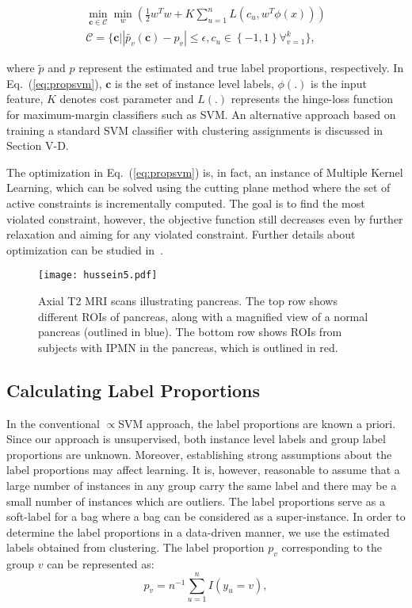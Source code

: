 \documentclass[journal]{IEEEtran}
\DeclareMathOperator*{\minimum}{min}
\begin{document}
\begin{equation}
\begin{split}
\minimum_{\mathbf{c} \in \mathcal{C}} \minimum_{w} \left(\frac{1}{2}w^Tw+K\sum_{u=1}^{n}L(c_u,w^T\phi(x))\right)\\
\mathcal{C}=\biggl\{ \mathbf{c} \bigg| \left | \widetilde{p_v}(\mathbf{c})-p_v \right | \leq \epsilon ,c_u \in \left \{ -1,1 \right \} \forall_{v=1}^{k} \biggr\},
\end{split}
\label{eq:propsvm}
\end{equation}

\noindent where $\widetilde{p}$ and $p$ represent the estimated and true label proportions, respectively. In Eq.~(\ref{eq:propsvm}), $\mathbf{c}$ is the set of instance level labels, $\phi(.)$ is the input feature, $K$ denotes cost parameter and $L(.)$ represents the hinge-loss function for maximum-margin classifiers such as SVM. An alternative approach based on training a standard SVM classifier with clustering assignments is discussed in Section V-D.

The optimization in Eq.~(\ref{eq:propsvm}) is, in fact, an instance of Multiple Kernel Learning, which can be solved using the cutting plane method where the set of active constraints is incrementally computed. The goal is to find the most violated constraint, however, the objective function still decreases even by further relaxation and aiming for any violated constraint. Further details about optimization can be studied in~\cite{yu2013propto}.

\begin{figure*}[t]
\centering
\texttt{[image: hussein5.pdf]}
\caption{Axial T2 MRI scans illustrating pancreas. The top row shows different ROIs of pancreas, along with a magnified view of a normal pancreas (outlined in blue). The bottom row shows ROIs from subjects with IPMN in the pancreas, which is outlined in red.}
\label{fig:IPMN}
\end{figure*}

\subsection{Calculating Label Proportions}
In the conventional $\propto$SVM approach, the label proportions are known a priori. Since our approach is unsupervised, both instance level labels and group label proportions are unknown. Moreover, establishing strong assumptions about the label proportions may affect learning. It is, however, reasonable to assume that a large number of instances in any group carry the same label and there may be a small number of instances which are outliers. The label proportions serve as a soft-label for a bag where a bag can be considered as a super-instance. In order to determine the label proportions in a data-driven manner, we use the estimated labels obtained from clustering. The label proportion $p_v$ corresponding to the group $v$ can be represented as:
\begin{equation}
p_{v}=n^{-1} \sum_{u=1}^{n}I(y_u=v),
\label{eq:label}
\end{equation}
\end{document}
